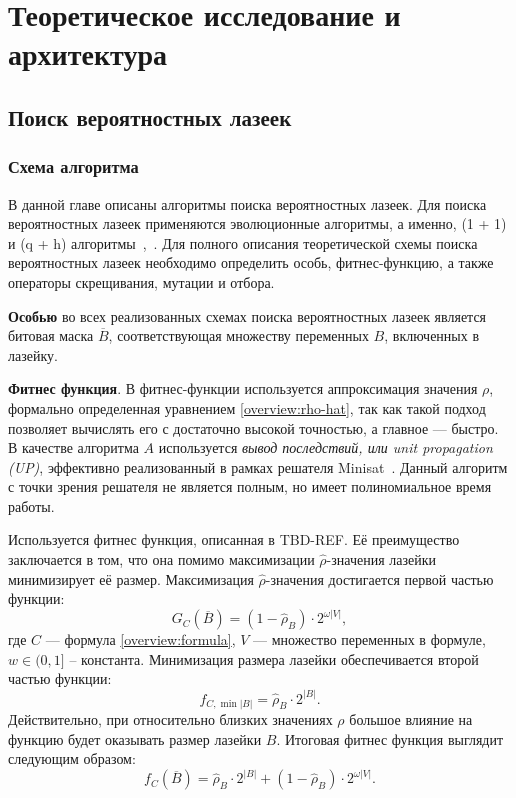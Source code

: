\chapter{Теоретическое исследование и архитектура}\label{arch}

\section{Поиск вероятностных лазеек}\label{arch:rbs}

\subsection{Схема алгоритма}\label{arch:rbs:schema}

В данной главе описаны алгоритмы поиска вероятностных лазеек.
Для поиска вероятностных лазеек применяются эволюционные алгоритмы, а именно, (1 + 1) и (q + h)
алгоритмы~\cite{bib:ea},~\cite{bib:ga}. Для полного описания теоретической схемы поиска 
вероятностных лазеек необходимо определить особь, фитнес-функцию, а также операторы скрещивания, 
мутации и отбора.

\textbf{Особью} во всех реализованных схемах поиска вероятностных лазеек является битовая маска
$\overline{B}$, соответствующая множеству переменных $B$, включенных в лазейку.

\textbf{Фитнес функция}. В фитнес-функции используется аппроксимация значения $\rho$, формально 
определенная уравнением \ref{overview:rho-hat}, так как такой
подход позволяет вычислять его с достаточно высокой точностью, а главное --- быстро. В качестве
алгоритма $A$ используется \textit{вывод последствий, или unit propagation (UP)}, эффективно реализованный
в рамках решателя Minisat~\cite{bib:minisat}. Данный алгоритм с точки зрения решателя не является
полным, но имеет полиномиальное время работы.

Используется фитнес функция, описанная в TBD-REF. Её преимущество заключается в том, что она помимо 
максимизации $\hat{\rho}$-значения лазейки минимизирует её размер. Максимизация $\hat{\rho}$-значения 
достигается первой частью функции:
\[
    G_{C}\left(\overline{B}\right) = (1 - \hat{\rho}_B) \cdot 2^{\omega |V|},
\]
где $C$ --- формула \ref{overview:formula}, $V$ --- множество переменных в формуле, $w \in (0, 1]$
-- константа. Минимизация размера лазейки обеспечивается второй частью функции:
\[
    f_{C, \min{|B|}} = \hat{\rho}_B \cdot 2^{|B|}.
\]
Действительно, при относительно близких значениях $\rho$ большое влияние на функцию будет оказывать
размер лазейки $B$. Итоговая фитнес функция выглядит следующим образом:
\begin{equation}
    f_{C}\left(\overline{B}\right) = \hat{\rho}_B \cdot 2^{|B|} + (1 - \hat{\rho}_B) \cdot 2^{\omega |V|}.
    \label{arch:fitness}
\end{equation}

